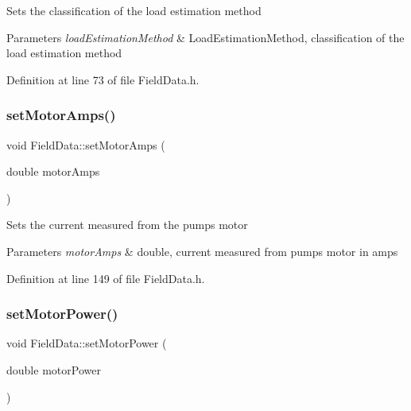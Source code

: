 Sets the classification of the load estimation method


\begin{DoxyParams}{Parameters}
{\em load\+Estimation\+Method} & Load\+Estimation\+Method, classification of the load estimation method \\
\hline
\end{DoxyParams}


Definition at line 73 of file Field\+Data.\+h.

\mbox{\label{class_field_data_a4f9373e8a215853b08bbe6a1915fb1a9}} 
\subsubsection{\texorpdfstring{set\+Motor\+Amps()}{setMotorAmps()}}
{\footnotesize\ttfamily void Field\+Data\+::set\+Motor\+Amps (\begin{DoxyParamCaption}\item[{double}]{motor\+Amps }\end{DoxyParamCaption})\hspace{0.3cm}{\ttfamily [inline]}}

Sets the current measured from the pump\textquotesingle{}s motor


\begin{DoxyParams}{Parameters}
{\em motor\+Amps} & double, current measured from pump\textquotesingle{}s motor in amps \\
\hline
\end{DoxyParams}


Definition at line 149 of file Field\+Data.\+h.

\mbox{\label{class_field_data_a078e6b4899e7046008ccc9de59bd0272}} 
\subsubsection{\texorpdfstring{set\+Motor\+Power()}{setMotorPower()}}
{\footnotesize\ttfamily void Field\+Data\+::set\+Motor\+Power (\begin{DoxyParamCaption}\item[{double}]{motor\+Power }\end{DoxyParamCaption})\hspace{0.3cm}{\ttfamily [inline]}}

